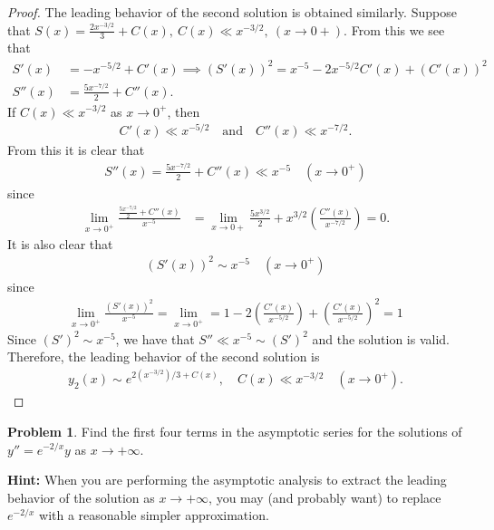 \documentclass[12pt]{article}
\theoremstyle{definition}
\newtheorem{problem}{Problem}
\begin{document}
\begin{proof}
  The leading behavior of the second solution is obtained similarly.
  Suppose that $S(x) = \frac{2x^{-3/2}}{3} + C(x),\ C(x) \ll x^{-3/2}, \ (x\to 0+)$. From this we see that
  \begin{align*}
    S'(x) &= -x^{-5/2} + C'(x) \implies (S'(x))^2 = x^{-5} -2x^{-5/2}C'(x) + (C'(x))^2 \\
    S''(x) &= \frac{5x^{-7/2}}{2} + C''(x).
  \end{align*}
  If $C(x) \ll x^{-3/2}$ as $x\to 0^+$, then
  \begin{align*}
    C'(x) \ll x^{-5/2} \quad \text{and} \quad C''(x) \ll x^{-7/2}.
  \end{align*}
  From this it is clear that
  \begin{align*}
    S''(x) = \frac{5x^{-7/2}}{2}+ C''(x) \ll x^{-5} \quad (x\to 0^+)
  \end{align*}
  since
  \begin{align*}
    \lim_{x\to 0^+} \frac{\frac{5x^{-7/2}}{2}+ C''(x)}{x^{-5}} &=  \lim_{x\to 0+}\frac{5x^{3/2}}{2} + x^{3/2}\left(\frac{C''(x)}{x^{-7/2}}\right) = 0.
  \end{align*}
  It is also clear that
  \begin{align*}
    (S'(x))^2 \sim x^{-5}\quad (x\to 0^+)
  \end{align*}
  since
  \begin{align*}
    \lim_{x\to 0^+} \frac{(S'(x))^2}{x^{-5}} = \lim_{x\to 0^+} = 1 - 2\left(\frac{C'(x)}{x^{-5/2}}\right) + \left(\frac{C'(x)}{x^{-5/2}}\right)^2 = 1
  \end{align*}
  Since $(S')^2 \sim x^{-5}$, we have that $S'' \ll x^{-5} \sim (S')^2$ and the solution is valid. Therefore, the leading behavior of the second solution is
  \begin{align*}
    y_2(x) \sim e^{2(x^{-3/2})/3 + C(x)},\quad C(x) \ll x^{-3/2} \quad(x\to 0^+).
  \end{align*}

\end{proof}
\newpage


\begin{problem}
  Find the first four terms in the asymptotic series for the solutions of $y'' = e^{-2/x}y$ as $x\to + \infty$.

  \textbf{Hint:} When you are performing the asymptotic analysis to extract the leading
  behavior of the solution as $x\to  + \infty$, you may (and probably want) to replace
  $e^{-2/x}$ with a reasonable simpler approximation.
\end{problem}
\end{document}
